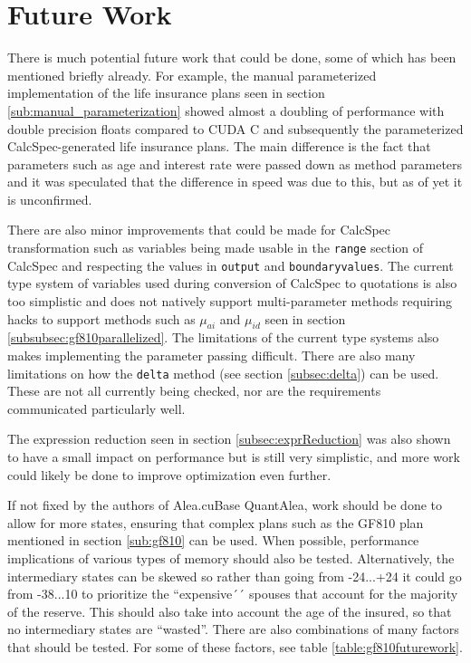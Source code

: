 \section{Future Work}
There is much potential future work that could be done, some of which has been mentioned briefly already.
For example, the manual parameterized implementation of the life insurance plans seen in section \ref{sub:manual_parameterization} showed almost a doubling of performance with double precision floats compared to CUDA C and subsequently the parameterized CalcSpec-generated life insurance plans.
The main difference is the fact that parameters such as age and interest rate were passed down as method parameters and it was speculated that the difference in speed was due to this, but as of yet it is unconfirmed.

There are also minor improvements that could be made for CalcSpec transformation such as variables being made usable in the \lstinline$range$ section of CalcSpec and respecting the values in \lstinline$output$ and \lstinline$boundaryvalues$.
The current type system of variables used during conversion of CalcSpec to quotations is also too simplistic and does not natively support multi-parameter methods requiring hacks to support methods such as $\mu_{ai}$ and $\mu_{id}$ seen in section \ref{subsubsec:gf810parallelized}.
The limitations of the current type systems also makes implementing the parameter passing difficult.
There are also many limitations on how the \lstinline$delta$ method (see section \ref{subsec:delta}) can be used.
These are not all currently being checked, nor are the requirements communicated particularly well.

The expression reduction seen in section \ref{subsec:exprReduction} was also shown to have a small impact on performance but is still very simplistic, and more work could likely be done to improve optimization even further.

If not fixed by the authors of Alea.cuBase QuantAlea, work should be done to allow for more states, ensuring that complex plans such as the GF810 plan mentioned in section \ref{sub:gf810} can be used.
When possible, performance implications of various types of memory should also be tested.
Alternatively, the intermediary states can be skewed so rather than going from -24...+24 it could go from -38...10 to prioritize the ``expensive´´ spouses that account for the majority of the reserve.
This should also take into account the age of the insured, so that no intermediary states are ``wasted''.
There are also combinations of many factors that should be tested.
For some of these factors, see table \ref{table:gf810futurework}.

